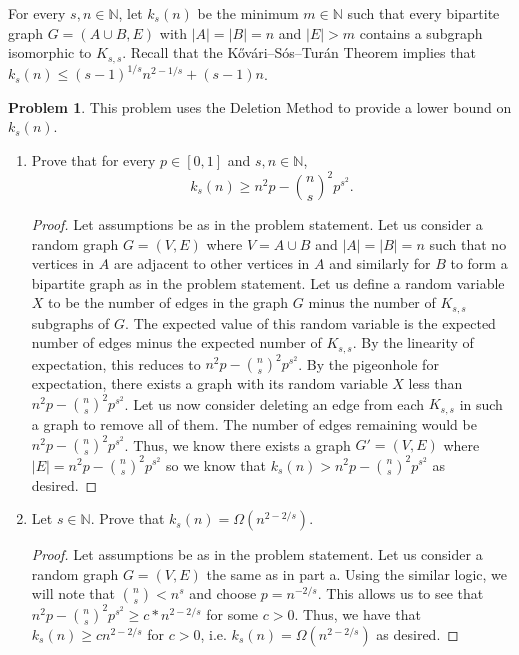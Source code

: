 \documentclass[11pt, letter]{amsart}
\theoremstyle{definition}
\newtheorem{problem}{Problem}[]
\begin{document}
\clearpage
For every $s, n \in \mathbb N$, let $k_s(n)$ be the minimum $m \in \mathbb N$ such that every bipartite graph $G = (A\cup B, E)$ with $|A| = |B| = n$ and $|E| > m$ contains a subgraph isomorphic to $K_{s,s}$.  Recall that the K\H{o}v\'ari--S\'os--Tur\'an Theorem implies that $k_s(n) \leq (s - 1)^{1/s}n^{2 - 1/s} + (s - 1)n$.  
\begin{problem}
  This problem uses the Deletion Method to provide a lower bound on $k_s(n)$.
  \begin{enumerate}[label=(\alph*)]
  \item Prove that for every $p \in [0,1]$ and $s,n \in \mathbb N$,
    \begin{equation*}
      k_s(n) \geq n^2p - \binom{n}{s}^2 p^{s^2}.
    \end{equation*}

    \begin{proof}
        Let assumptions be as in the problem statement. Let us consider a random graph $G = (V, E)$ where $V = A\cup B$ and $|A| = |B| = n$ such that no vertices in $A$ are adjacent to other vertices in $A$ and similarly for $B$ to form a bipartite graph as in the problem statement. Let us define a random variable $X$ to be the number of edges in the graph $G$ minus the number of $K_{s,s}$ subgraphs of $G$. The expected value of this random variable is the expected number of edges minus the expected number of $K_{s,s}$. By the linearity of expectation, this reduces to $n^2p-\binom{n}{s}^2p^{s^2}$. By the pigeonhole for expectation, there exists a graph with its random variable $X$ less than $n^2p-\binom{n}{s}^2p^{s^2}$. Let us now consider deleting an edge from each $K_{s,s}$ in such a graph to remove all of them. The number of edges remaining would be $n^2p - \binom{n}{s}^2p^{s^2}$. Thus, we know there exists a graph $G' = (V, E)$ where $|E| = n^2p-\binom{n}{s}^2p^{s^2}$ so we know that $k_s(n) > n^2p-\binom{n}{s}^2p^{s^2}$ as desired.
    \end{proof}
    
  \item   Let $s \in \mathbb N$.  Prove that $k_s(n) = \Omega(n^{2 - 2/s})$.

    \begin{proof}
        Let assumptions be as in the problem statement. Let us consider a random graph $G = (V, E)$ the same as in part a. Using the similar logic, we will note that $\binom{n}{s} < n^s$ and choose $p = n^{-2/s}$. This allows us to see that $n^2p - \binom{n}{s}^2 p^{s^2} \geq c * n^{2-2/s}$ for some $c > 0$. Thus, we have that $k_s(n) \geq cn^{2-2/s}$ for $c > 0$, i.e. $k_s(n) = \Omega(n^{2-2/s})$ as desired.
    \end{proof}
  
  \end{enumerate}

  
\end{problem}
\end{document}
